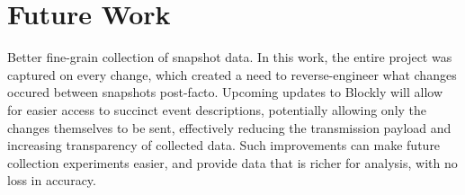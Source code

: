 \section{Future Work}
\label{sec:futurework}

Better fine-grain collection of snapshot data. In this work, the entire project was captured on every change, which created a need to reverse-engineer what changes occured between snapshots post-facto. Upcoming updates to Blockly will allow for easier access to succinct event descriptions, potentially allowing only the changes themselves to be sent, effectively reducing the transmission payload and increasing transparency of collected data. Such improvements can make future collection experiments easier, and provide data that is richer for analysis, with no loss in accuracy. 
